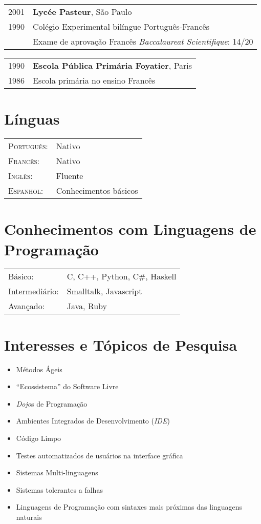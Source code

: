 \documentclass[letter,10pt]{article}
\begin{document}
\begin{tabular}{p{2.5cm}l}
  \textsc{2001} & \textbf{Lycée Pasteur}, São Paulo\\
  \textsc{1990} & Colégio Experimental bilíngue Português-Francês\\
  & Exame de aprovação Francês \textit{Baccalaureat Scientifique}: 14/20
\end{tabular}

\begin{tabular}{p{2.5cm}l}
  \textsc{1990} & \textbf{Escola Pública Primária Foyatier}, Paris\\
  \textsc{1986} & Escola primária no ensino Francês\\
\end{tabular}

\section{Línguas}
\begin{tabular}{p{2.5cm}l}
 \textsc{Português:}&Nativo\\
 \textsc{Francês:}&Nativo\\
 \textsc{Inglês:}&Fluente\\
 \textsc{Espanhol:}&Conhecimentos básicos\\
\end{tabular}

\section{Conhecimentos com Linguagens de Programação}
\begin{tabular}{p{2.5cm}l}
 Básico:& C, C++, Python, C\#, Haskell\\
 Intermediário:& Smalltalk, Javascript\\
 Avançado:& Java, Ruby\\
\end{tabular}

\section{Interesses e Tópicos de Pesquisa}

\begin{itemize}
\item Métodos Ágeis
\item ``Ecossistema'' do Software Livre
\item \textit{Dojo}s de Programação
\item Ambientes Integrados de Desenvolvimento (\textit{IDE})
\item Código Limpo
\item Testes automatizados de usuários na interface gráfica
\item Sistemas Multi-linguagens
\item Sistemas tolerantes a falhas
\item Linguagens de Programação com sintaxes mais próximas das
  linguagens naturais
\end{itemize}
\end{document}
